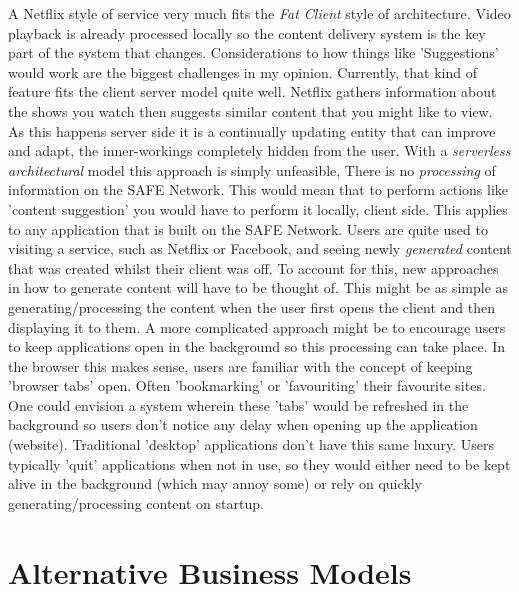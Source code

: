 A Netflix style of service very much fits the \textit{Fat Client} style of architecture. Video playback is already processed locally so the content delivery system is the key part of the system that changes. Considerations to how things like 'Suggestions' would work are the biggest challenges in my opinion. Currently, that kind of feature fits the client server model quite well. Netflix gathers information about the shows you watch then suggests similar content that you might like to view. As this happens server side it is a continually updating entity that can improve and adapt, the inner-workings completely hidden from the user. With a \textit{serverless architectural} model this approach is simply unfeasible, There is no \textit{processing} of information on the SAFE Network. This would mean that to perform actions like 'content suggestion' you would have to perform it locally, client side. This applies to any application that is built on the SAFE Network. Users are quite used to visiting a service, such as Netflix or Facebook, and seeing newly \textit{generated} content that was created whilst their client was off. To account for this, new approaches in how to generate content will have to be thought of. This might be as simple as generating/processing the content when the user first opens the client and then displaying it to them. A more complicated approach might be to encourage users to keep applications open in the background so this processing can take place. In the browser this makes sense, users are familiar with the concept of keeping 'browser tabs' open. Often 'bookmarking' or 'favouriting' their favourite sites. One could envision a system wherein these 'tabs' would be refreshed in the background so users don't notice any delay when opening up the application (website). Traditional 'desktop' applications don't have this same luxury. Users typically 'quit' applications when not in use, so they would either need to be kept alive in the background (which may annoy some) or rely on quickly generating/processing content on startup.

\section{Alternative Business Models}

